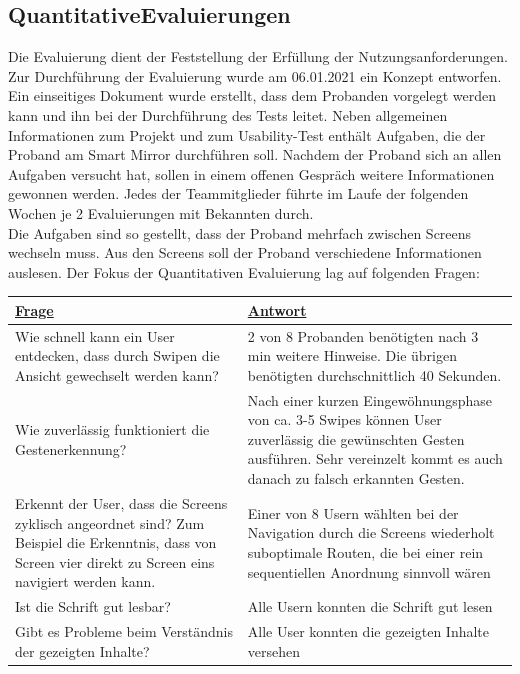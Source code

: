 \documentclass[12pt, a4paper]{scrartcl}
\begin{document}
	\subsection{QuantitativeEvaluierungen}
	Die Evaluierung dient der Feststellung der Erfüllung der Nutzungsanforderungen. Zur Durchführung der Evaluierung wurde am 06.01.2021 ein Konzept entworfen. Ein einseitiges Dokument wurde erstellt, dass dem Probanden vorgelegt werden kann und ihn bei der Durchführung des Tests leitet. Neben allgemeinen Informationen zum Projekt und zum Usability-Test enthält Aufgaben, die der Proband am Smart Mirror durchführen soll. Nachdem der Proband sich an allen Aufgaben versucht hat, sollen in einem offenen Gespräch weitere Informationen gewonnen werden. Jedes der Teammitglieder führte im Laufe der folgenden Wochen je 2 Evaluierungen mit Bekannten durch.\\
	Die Aufgaben sind so gestellt, dass der Proband mehrfach zwischen Screens wechseln muss. Aus den Screens soll der Proband verschiedene Informationen auslesen. Der Fokus der Quantitativen Evaluierung lag auf folgenden Fragen:\\
	\begin{tabularx}{0.95\textwidth}{|X|X|}
		\hline
		\textcolor{tumbleweed}{\underline{\textbf{Frage}}} & \textcolor{tumbleweed}{\underline{\textbf{Antwort}}}\\
		\hline
		Wie schnell kann ein User entdecken, dass durch Swipen die Ansicht gewechselt werden kann? & 2 von 8 Probanden benötigten nach 3 min weitere Hinweise. Die übrigen benötigten durchschnittlich 40 Sekunden.\\
		\hline
		Wie zuverlässig funktioniert die Gestenerkennung?&Nach einer kurzen Eingewöhnungsphase von ca. 3-5 Swipes können User zuverlässig die gewünschten Gesten ausführen. Sehr vereinzelt kommt es auch danach zu falsch erkannten Gesten.\\
		\hline
		Erkennt der User, dass die Screens zyklisch angeordnet sind? Zum Beispiel die Erkenntnis, dass von Screen vier direkt zu Screen eins navigiert werden kann.&Einer von 8 Usern wählten bei der Navigation durch die Screens wiederholt suboptimale Routen, die bei einer rein sequentiellen Anordnung sinnvoll wären\\
		\hline
		Ist die Schrift gut lesbar?&
		Alle Usern konnten die Schrift gut lesen\\
		\hline
		Gibt es Probleme beim Verständnis der gezeigten Inhalte? & Alle User konnten die gezeigten Inhalte versehen\\
		\hline
	\end{tabularx}
	
\end{document}
